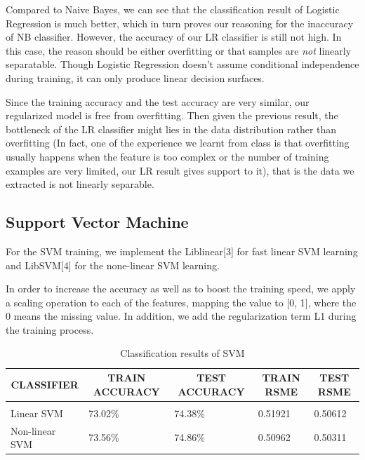 \documentclass{article} %
\begin{document}
Compared to Naive Bayes, we can see that the classification result of Logistic Regression is much better, which in turn proves our reasoning for the inaccuracy of NB classifier. However, the accuracy of our LR classifier is still not high. In this case, the reason should be either overfitting or that samples are \emph{not} linearly separatable. Though Logistic Regression doesn't assume conditional independence during training, it can only produce linear decision surfaces.

Since the training accuracy and the test accuracy are very similar, our regularized model is free from overfitting. Then given the previous result, the bottleneck of the LR classifier might lies in the data distribution rather than overfitting (In fact, one of the experience we learnt from class is that overfitting usually happens when the feature is too complex or the number of training examples are very limited, our LR result gives support to it), that is the data we extracted is not linearly separable.  


\subsection{Support Vector Machine}
For the SVM training, we implement the Liblinear[3] for fast linear SVM learning and LibSVM[4] for the none-linear SVM learning. 

In order to increase the accuracy as well as to boost the training speed, we apply a scaling operation to each of the features, mapping the value to [0, 1], where the 0 means the missing value. In addition, we add the regularization term L1 during the training process.

\begin{table}[h]
\caption{Classification results of SVM}
\label{sample-table}
\begin{center}
\begin{tabular}{lllll}
\multicolumn{1}{c}{\bf CLASSIFIER}  &\multicolumn{1}{c}{\bf TRAIN ACCURACY}  &\multicolumn{1}{c}{\bf TEST ACCURACY} &\multicolumn{1}{c}{\bf TRAIN RSME} &\multicolumn{1}{c}{\bf TEST RSME}
\\ \hline \\

Linear SVM         &73.02\%  &74.38\% &0.51921 &0.50612\\
Non-linear SVM     &73.56\%  &74.86\% &0.50962 &0.50311\\
\end{tabular}
\end{center}
\end{table}
\end{document}
